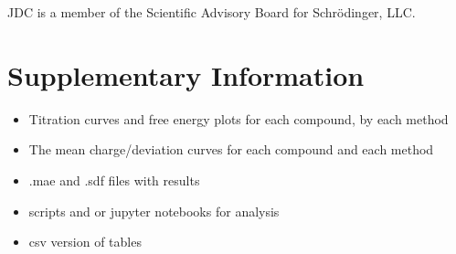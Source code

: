\documentclass[9pt,lineno,final]{elife}
\begin{document}
JDC is a member of the Scientific Advisory Board for Schr\"{o}dinger, LLC.





\appendix

\section{Supplementary Information}



% 





\begin{itemize}
	\item Titration curves and free energy plots for each compound, by each method
	\item The mean charge/deviation curves for each compound and each method
	\item .mae and .sdf files with results
	\item scripts and or jupyter notebooks for analysis
	\item csv version of tables
\end{itemize}
\end{document}
